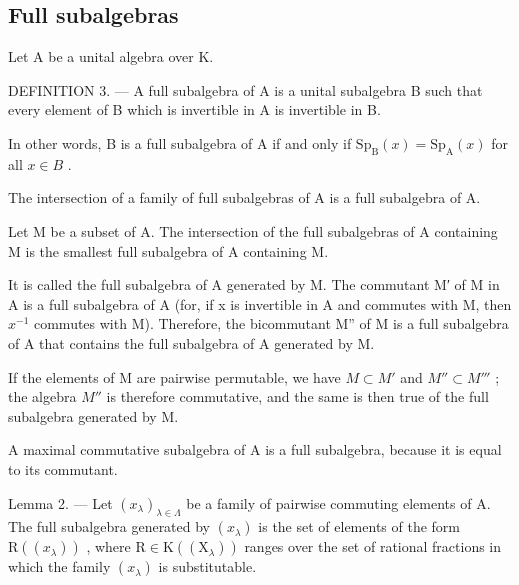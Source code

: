 \subsection{Full subalgebras}

Let A be a unital algebra over K.

DEFINITION 3. --- A full subalgebra of A is a unital subalgebra B such that every element of B which is invertible in A is invertible in B.

In other words, B is a full subalgebra of A if and only if \(\mathrm{Sp}_{\mathrm{B}}(x)=\mathrm{Sp}_{\mathrm{A}}(x)\) for all \(x\in B\) .

The intersection of a family of full subalgebras of A is a full subalgebra of A.

Let M be a subset of A. The intersection of the full subalgebras of A containing M is the smallest full subalgebra of A containing M.

It is called the full subalgebra of A generated by M. The commutant M′ of M in A is a full subalgebra of A (for, if x is invertible in A and commutes with M, then \(x^{-1}\) commutes with M). Therefore, the bicommutant M'' of M is a full subalgebra of A that contains the full subalgebra of A generated by M.

If the elements of M are pairwise permutable, we have \(M \subset M'\) and \(M'' \subset M'''\) ; the algebra \(M''\) is therefore commutative, and the same is then true of the full subalgebra generated by M.

A maximal commutative subalgebra of A is a full subalgebra, because it is equal to its commutant.

Lemma 2. --- Let \((x_{\lambda})_{\lambda \in \Lambda}\) be a family of pairwise commuting elements of A. The full subalgebra generated by \((x_{\lambda})\) is the set of elements of the form \(\mathrm{R}((x_{\lambda}))\) , where \(\mathrm{R} \in \mathrm{K}((\mathrm{X}_{\lambda}))\) ranges over the set of rational fractions in which the family \((x_{\lambda})\) is substitutable.

